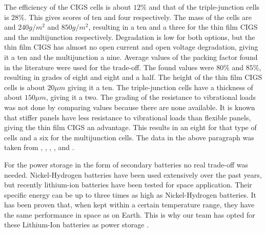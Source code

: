 The efficiency of the CIGS cells is about $12\%$ and that of the triple-junction cells is $28\%$. This gives scores of ten and four respectively.
The mass of the cells are and $240g/m^2$ and $850g/m^2$, resulting in a ten and a three for the thin film CIGS and the multijunction respectively.
Degradation is low for both options, but the thin film CIGS has almost no open current and open voltage degradation, giving it a ten and the multijunction a nine. Average values of the packing factor found in the literature were used for the trade-off. The found values were $80\%$ and $85\%$, resulting in grades of eight and eight and a half. The height of the thin film CIGS cells is about $20\mu m$ giving it a ten. The triple-junction cells have a thickness of about $150\mu m$, giving it a two.
The grading of the resistance to vibrational loads was not done by comparing values because there are none available. It is known that stiffer panels have less resistance to vibrational loads than flexible panels, giving the thin film CIGS an advantage. This results in an eight for that type of cells and a six for the multijunction cells.
The data in the above paragraph was taken from \cite{esa_telecomm}, \cite{delfi_c3}, \cite{dutchspace}, \cite{spectrolab}, \cite{cubesatshop} and \cite{azurspace}.

For the power storage in the form of secondary batteries no real trade-off was needed. Nickel-Hydrogen batteries have been used extensively over the past years, but recently lithium-ion batteries have been tested for space application. Their specific energy can be up to three times as high as Nickel-Hydrogen batteries. It has been proven that, when kept within a certain temperature range, they have the same performance in space as on Earth. This is why our team has opted for these Lithium-Ion batteries as power storage \cite{LEO_li_ion}.